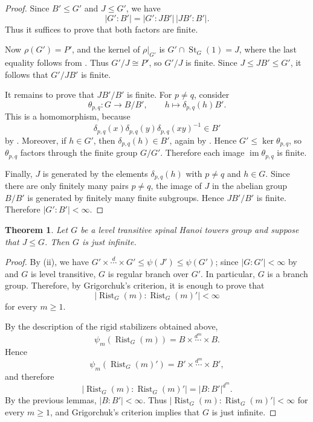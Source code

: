 \documentclass[11pt,leqno]{amsart}
\theoremstyle{plain}
\newtheorem{theorem}{Theorem}[section]
\DeclareMathOperator{\St}{St}
\DeclareMathOperator{\Rist}{Rist}
\numberwithin{equation}{section}
\begin{document}
\begin{proof}
	Since $B'\leq G'$ and $J\leq G'$, we have
	\[
	|G':B'|=|G':JB'|\,|JB':B'|.
	\]
	Thus it suffices to prove that both factors are finite. 

	Now $\rho(G')=P'$, and the kernel of $\rho|_{G'}$ is
	$G'\cap \St_G(1)=J$, where the last equality follows from . Thus
	$G'/J\cong P'$,
	so $G'/J$ is finite. Since $J\leq JB'\leq G'$, it follows that $G'/JB'$ is finite.
	
	It remains to prove that $JB'/B'$ is finite. For $p\neq q$, consider
	\[
	\theta_{p,q}\colon G\longrightarrow B/B',
	\qquad
	h\longmapsto \delta_{p,q}(h)B'.
	\]
	This is a homomorphism, because
	\[
	\delta_{p,q}(x)\delta_{p,q}(y)\delta_{p,q}(xy)^{-1}\in B'
	\]
	by . Moreover, if $h\in G'$, then
	$\delta_{p,q}(h)\in B'$, again by . Hence
	$G'\leq \ker\theta_{p,q}$, so $\theta_{p,q}$ factors through the finite group $G/G'$.
	Therefore each image $\operatorname{im}\theta_{p,q}$ is finite.
	
	Finally, $J$ is generated by the elements $\delta_{p,q}(h)$ with $p\neq q$ and $h\in G$.
	Since there are only finitely many pairs $p\neq q$, the image of $J$ in the abelian group
	$B/B'$ is generated by finitely many finite subgroups. Hence $JB'/B'$ is finite. Therefore
	$|G':B'|<\infty$.
\end{proof}
\begin{theorem}\label{thm:justinfinite}
Let $G$ be a level transitive spinal Hanoi towers group and suppose that $J\leq G$. Then $G$ is just infinite.
\end{theorem}

\begin{proof}
By (ii), we have $G'\times \stackrel{d}{\cdots}\times G'\leq\psi(J')\leq\psi(G')$; since $|G:G'|<\infty$ by  and $G$ is level transitive, $G$ is regular branch over $G'$. In particular, $G$ is a branch group. Therefore, by Grigorchuk's
criterion, it is enough to prove that
\[
|\Rist_G(m):\Rist_G(m)'|<\infty
\]
for every $m\geq 1$.

By the description of the rigid stabilizers obtained above,
\[
\psi_m(\Rist_G( m))
=
B\times\stackrel{d^m}{\cdots}\times B.
\]
Hence
\[
\psi_m(\Rist_G( m)')
=
B'\times\stackrel{d^m}{\cdots}\times B',
\]
and therefore
\[
|\Rist_G( m):\Rist_G( m)'|
=
|B:B'|^{d^m}.
\]
By the previous lemmas, $|B:B'|<\infty$. Thus
$|\Rist_G( m):\Rist_G( m)'|<\infty$ for every $m\geq 1$, and Grigorchuk's criterion
implies that $G$ is just infinite.
\end{proof}
\end{document}
